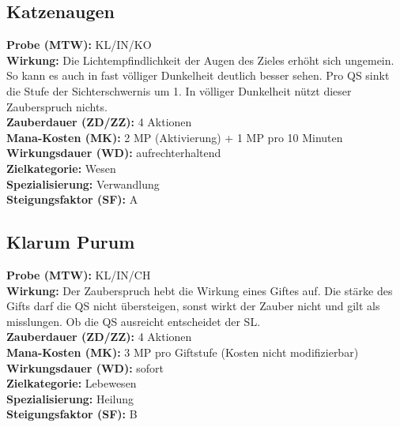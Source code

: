 \subsection{Katzenaugen}
\label{chap:katzenaugen}
\textbf{Probe (MTW):} KL/IN/KO \\
\textbf{Wirkung:} Die Lichtempfindlichkeit der Augen des Zieles erhöht sich ungemein. So kann es auch in fast völliger Dunkelheit deutlich besser sehen. Pro QS sinkt die Stufe der Sichterschwernis um 1. In völliger Dunkelheit nützt dieser Zauberspruch nichts. \\
\textbf{Zauberdauer (ZD/ZZ):} 4 Aktionen \\
\textbf{Mana-Kosten (MK):} 2 MP (Aktivierung) + 1 MP pro 10 Minuten \\
\textbf{Wirkungsdauer (WD):} aufrechterhaltend \\
\textbf{Zielkategorie:} Wesen \\
\textbf{Spezialisierung:} Verwandlung \\
\textbf{Steigungsfaktor (SF):} A


\subsection{Klarum Purum}
\label{chap:klarum_purum}
\textbf{Probe (MTW):} KL/IN/CH \\
\textbf{Wirkung:} Der Zauberspruch hebt die Wirkung eines Giftes auf. Die stärke des Gifts darf die QS nicht übersteigen, sonst wirkt der Zauber nicht und gilt als misslungen. Ob die QS ausreicht entscheidet der SL. \\
\textbf{Zauberdauer (ZD/ZZ):} 4 Aktionen \\
\textbf{Mana-Kosten (MK):} 3 MP pro Giftstufe (Kosten nicht modifizierbar) \\
\textbf{Wirkungsdauer (WD):} sofort \\
\textbf{Zielkategorie:} Lebewesen \\
\textbf{Spezialisierung:} Heilung \\
\textbf{Steigungsfaktor (SF):} B


